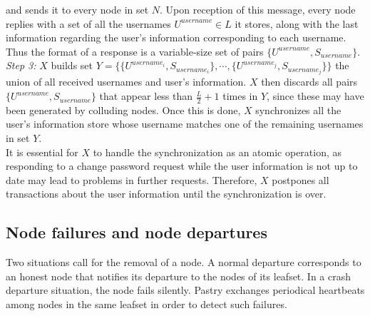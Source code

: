 and sends it to every node in set $N$. Upon reception of this message, every
node replies with a set of all the usernames $U^{username} \in L$ it
stores, along with the last information regarding the user's
information corresponding to each username. Thus the format of a response is a
variable-size set of pairs $\{ U^{username}, S_{username}\}$.\\


\textit{Step 3:} $X$ builds set 
$Y =  \{ \{U^{username_i}, S_{username_i}\},\cdots,\{ U^{username_j},
S_{username_j}\} \} $ the union of all received usernames and user's
information. $X$ then discards all pairs $\{ U^{username}, S_{username}\}$ that
appear less than $\frac{L}{2} +1$ times in $Y$, since these may have been
generated by colluding nodes. Once this is done, $X$ synchronizes all the
user's information store whose username matches one of the remaining usernames
in set $Y$.\\


It is essential for $X$ to handle the synchronization as an atomic operation,
as responding to a change password request while the user information is not up
to date may lead to problems in further requests. Therefore, $X$ postpones all
transactions about the user information until the synchronization is over.

\subsection{Node failures and node departures}
\label{sec:node_failures_and_departures}
Two situations call for the removal of a node. A normal departure corresponds
to an honest node that notifies its departure to the nodes of its leafset. In a
crash departure situation, the node fails silently. Pastry exchanges
periodical heartbeats among nodes in the same leafset in order to detect such
failures.\\

